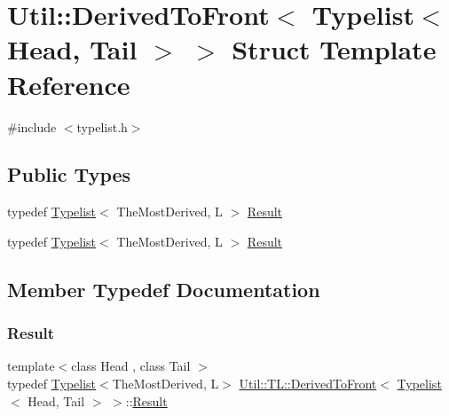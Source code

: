 \hypertarget{structUtil_1_1TL_1_1DerivedToFront_3_01Typelist_3_01Head_00_01Tail_01_4_01_4}{}\section{Util\+:\+:Derived\+To\+Front$<$ Typelist$<$ Head, Tail $>$ $>$ Struct Template Reference}
\label{structUtil_1_1TL_1_1DerivedToFront_3_01Typelist_3_01Head_00_01Tail_01_4_01_4}


{\ttfamily \#include $<$typelist.\+h$>$}

\subsection*{Public Types}
\begin{DoxyCompactItemize}
\item 
typedef \mbox{\hyperlink{structUtil_1_1Typelist}{Typelist}}$<$ The\+Most\+Derived, L $>$ \mbox{\hyperlink{structUtil_1_1TL_1_1DerivedToFront_3_01Typelist_3_01Head_00_01Tail_01_4_01_4_ae5fcbfce9e50c52c4c5cfe7626e32ddd}{Result}}
\item 
typedef \mbox{\hyperlink{structUtil_1_1Typelist}{Typelist}}$<$ The\+Most\+Derived, L $>$ \mbox{\hyperlink{structUtil_1_1TL_1_1DerivedToFront_3_01Typelist_3_01Head_00_01Tail_01_4_01_4_ae5fcbfce9e50c52c4c5cfe7626e32ddd}{Result}}
\end{DoxyCompactItemize}


\subsection{Member Typedef Documentation}
\mbox{\label{structUtil_1_1TL_1_1DerivedToFront_3_01Typelist_3_01Head_00_01Tail_01_4_01_4_ae5fcbfce9e50c52c4c5cfe7626e32ddd}} 
\subsubsection{\texorpdfstring{Result}{Result}\hspace{0.1cm}{\footnotesize\ttfamily [1/2]}}
{\footnotesize\ttfamily template$<$class Head , class Tail $>$ \\
typedef \mbox{\hyperlink{structUtil_1_1Typelist}{Typelist}}$<$The\+Most\+Derived, L$>$ \mbox{\hyperlink{structUtil_1_1TL_1_1DerivedToFront}{Util\+::\+T\+L\+::\+Derived\+To\+Front}}$<$ \mbox{\hyperlink{structUtil_1_1Typelist}{Typelist}}$<$ Head, Tail $>$ $>$\+::\mbox{\hyperlink{structUtil_1_1TL_1_1DerivedToFront_3_01Typelist_3_01Head_00_01Tail_01_4_01_4_ae5fcbfce9e50c52c4c5cfe7626e32ddd}{Result}}}

